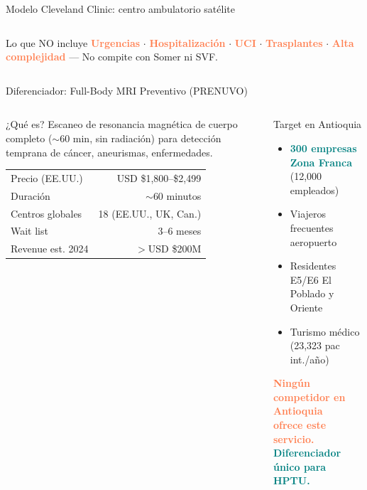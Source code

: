 \documentclass[aspectratio=169, 11pt]{beamer}
\newcommand{\highlight}[1]{\textcolor{teal}{\textbf{#1}}}
\newcommand{\danger}[1]{\textcolor{coral}{\textbf{#1}}}
\newcommand{\src}[1]{\par\vspace{2pt}{\tiny\textcolor{slate}{Fuente: #1}}}
\begin{document}
{\begin{frame}{Modelo Cleveland Clinic: centro ambulatorio satélite}
\begin{columns}[T]
\begin{alertblock}{\small Lo que NO incluye}
\scriptsize
\danger{Urgencias} $\cdot$ \danger{Hospitalización} $\cdot$ \danger{UCI} $\cdot$ \danger{Trasplantes} $\cdot$ \danger{Alta complejidad} --- No compite con Somer ni SVF.
\end{alertblock}
\end{columns}
\end{frame}
}

\begin{frame}{Diferenciador: Full-Body MRI Preventivo (PRENUVO)}
\begin{columns}[T]
\begin{block}{\small ¿Qué es?}
\footnotesize
Escaneo de resonancia magnética de cuerpo completo ($\sim$60 min, sin radiación) para detección temprana de cáncer, aneurismas, enfermedades.

\vspace{4pt}
\begin{tabular}{@{}lr@{}}
\toprule
Precio (EE.UU.) & USD \$1,800--\$2,499 \\
Duración & $\sim$60 minutos \\
Centros globales & 18 (EE.UU., UK, Can.) \\
Wait list & 3--6 meses \\
Revenue est. 2024 & $>$USD \$200M \\
\bottomrule
\end{tabular}
\end{block}

\begin{exampleblock}{\small Target en Antioquia}
\footnotesize
\begin{itemize}\setlength{\itemsep}{2pt}
  \item \highlight{300 empresas Zona Franca} (12,000 empleados)
  \item Viajeros frecuentes aeropuerto
  \item Residentes E5/E6 El Poblado y Oriente
  \item Turismo médico (23,323 pac int./año)
\end{itemize}

\vspace{6pt}
\centering
\danger{Ningún competidor en Antioquia\\ofrece este servicio.}\\[4pt]
\highlight{Diferenciador único para HPTU.}
\end{exampleblock}
\end{columns}
\src{PRENUVO.com, Forbes, Bloomberg 2024}
\end{frame}
\end{document}
